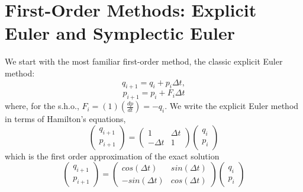 \documentclass[12pt]{article}
\begin{document}
\section{First-Order Methods: Explicit Euler and Symplectic Euler}
We start with the most familiar first-order method, the classic explicit Euler method:
\[q_{i+1}=q_i+p_i\Delta t,\]
\[p_{i+1}=p_i+F_i\Delta t\]
where, for the s.h.o., $F_i=(1)(\frac{dp}{dt})=-q_i$. We write the explicit Euler method in terms of Hamilton's equations,
\[\left (\begin{matrix}
  q_{i+1}  \\
  p_{i+1} 
 \end{matrix}\right)=
\left(\begin{matrix}
  1 & \Delta t \\
  -\Delta t & 1 
 \end{matrix}\right)
\left(\begin{matrix}
  q_i  \\
  p_i 
 \end{matrix}\right)\]
which is the first order approximation of the exact solution
\[\left (\begin{matrix}
  q_{i+1}  \\
  p_{i+1} 
 \end{matrix}\right)=
\left(\begin{matrix}
  cos(\Delta t) & sin(\Delta t) \\
  -sin(\Delta t) & cos(\Delta t) 
 \end{matrix}\right)
\left(\begin{matrix}
  q_i  \\
  p_i 
 \end{matrix}\right)\]
\end{document}
